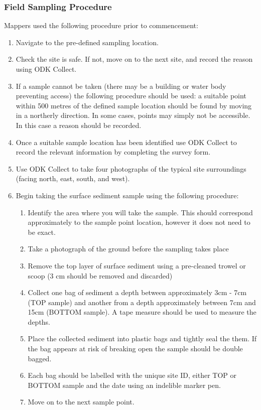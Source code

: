 \documentclass[a4paper,12pt,twoside]{article}
\begin{document}
\color{RHblue}
\subsubsection{Field Sampling Procedure}

\color{RHgrey}
Mappers used the following procedure prior to commencement:
\begin{enumerate}
\item Navigate to the pre-defined sampling location.
\item Check the site is safe. If not, move on to the next site, and record the reason using ODK Collect.
\item If a sample cannot be taken (there may be a building or water body preventing access) the following procedure should be used: a suitable point within 500 metres of the defined sample location should be found by moving in a northerly direction. In some cases, points may simply not be accessible. In this case a reason should be recorded.
\item Once a suitable sample location has been identified use ODK Collect to record the relevant information by completing the survey form.
\item Use ODK Collect to take four photographs of the typical site surroundings (facing north, east, south, and west).
\item Begin taking the surface sediment sample using the following procedure:
\begin{enumerate}
\item Identify the area where you will take the sample. This should correspond
approximately to the sample point location, however it does not need to be exact.
\item Take a photograph of the ground before the sampling takes place
\item Remove the top layer of surface sediment using a pre-cleaned trowel or scoop (3 cm should be removed and discarded)
\item Collect one bag of sediment a depth between approximately 3cm - 7cm (TOP sample) and another from a depth approximately between 7cm and 15cm (BOTTOM sample). A tape measure should be used to measure the depths.
\item Place the collected sediment into plastic bags and tightly seal the them. If the bag appears at risk of breaking open the sample should be double bagged.
\item Each bag should be labelled with the unique site ID, either TOP or BOTTOM sample and the date using an indelible marker pen.
\item Move on to the next sample point.
\end{enumerate}
\end{enumerate}
\end{document}
